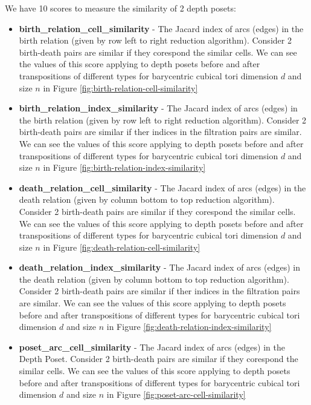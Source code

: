 \documentclass{article}
\begin{document}
\par We have 10 scores to measure the similarity of 2 depth posets: 
\begin{itemize}
\item \textbf{birth\_relation\_cell\_similarity} - The Jacard index of arcs (edges) in the birth relation (given by row left to right reduction algorithm).
    Consider 2 birth-death pairs are similar if they corespond the similar cells.
We can see the values of this score applying to depth posets before and after transpositions of different types for barycentric cubical tori dimension $d$ and size $n$ in Figure \ref{fig:birth-relation-cell-similarity}
\item \textbf{birth\_relation\_index\_similarity} - The Jacard index of arcs (edges) in the birth relation (given by row left to right reduction algorithm).
    Consider 2 birth-death pairs are similar if ther indices in the filtration pairs are similar.
We can see the values of this score applying to depth posets before and after transpositions of different types for barycentric cubical tori dimension $d$ and size $n$ in Figure \ref{fig:birth-relation-index-similarity}
\item \textbf{death\_relation\_cell\_similarity} - The Jacard index of arcs (edges) in the death relation (given by column bottom to top reduction algorithm).
    Consider 2 birth-death pairs are similar if they corespond the similar cells.
We can see the values of this score applying to depth posets before and after transpositions of different types for barycentric cubical tori dimension $d$ and size $n$ in Figure \ref{fig:death-relation-cell-similarity}
\item \textbf{death\_relation\_index\_similarity} - The Jacard index of arcs (edges) in the death relation (given by column bottom to top reduction algorithm).
    Consider 2 birth-death pairs are similar if ther indices in the filtration pairs are similar.
We can see the values of this score applying to depth posets before and after transpositions of different types for barycentric cubical tori dimension $d$ and size $n$ in Figure \ref{fig:death-relation-index-similarity}
\item \textbf{poset\_arc\_cell\_similarity} - The Jacard index of arcs (edges) in the Depth Poset.
    Consider 2 birth-death pairs are similar if they corespond the similar cells.
We can see the values of this score applying to depth posets before and after transpositions of different types for barycentric cubical tori dimension $d$ and size $n$ in Figure \ref{fig:poset-arc-cell-similarity}

\end{itemize}
\end{document}
